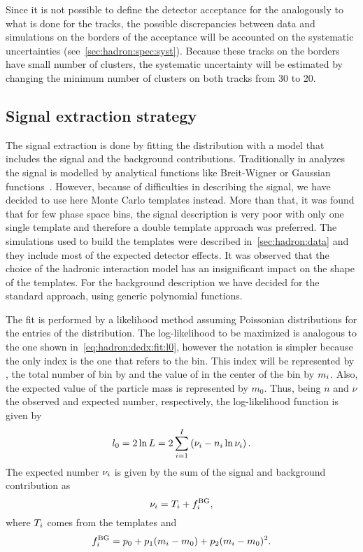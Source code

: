 Since it is not possible to define the detector acceptance for
the \vzeros analogously to what is done for the tracks, the possible
discrepancies between data and simulations on the borders of the acceptance
will be accounted on the systematic uncertainties (see~\cref{sec:hadron:spec:syst}).
Because these tracks on the borders have small number of clusters,
the systematic uncertainty will be estimated by changing the minimum number
of clusters on both tracks from 30 to 20. 

\subsection{Signal extraction strategy}
\label{sec:hadron:vzero:signal}


The signal extraction is done by fitting the \minv distribution
with a model that includes the signal and the background contributions.
Traditionally in \NASixtyOne analyzes the signal
is modelled by analytical functions like Breit-Wigner
or Gaussian functions~\cite{Abgrall:2015hmv,Aduszkiewicz:2015dmr}. 
However, because of difficulties in describing
the \kzeros signal, we have decided to use here
Monte Carlo templates instead. More than that, it was found
that for few \kzeros phase space bins,
the signal description is very poor
with only one single template and therefore a double template approach
was preferred.
The simulations used to build the templates were described
in~\cref{sec:hadron:data} and they include most of the expected
detector effects. It was observed that the choice of the
hadronic interaction model has an insignificant impact
on the shape of the templates.
For the background description we have decided
for the standard approach, using generic polynomial functions.



The fit is performed by a likelihood method assuming Poissonian
distributions for the entries of the \minv distribution.
The log-likelihood to be maximized is analogous to the one shown
in~\cref{eq:hadron:dedx:fit:l0}, however the notation is
simpler because the only index is the one
that refers to the \minv bin. This index will be represented by \imass,
the total number of \minv bin by \nmass and the value of \minv in the center
of the bin by $m_i$. Also, the expected value of the particle mass
is represented by $m_0$.
Thus, being $n$ and $\nu$ the observed and expected number, respectively,
the log-likelihood function is given by
\begin{equation}
  l_0 = 2\ln L = 2\sum_{i=1}^{I} \left(\nu_{i} - n_{i}\ln\nu_{i}\right). 
  \label{eq:hadron:vzero:fit:l0}
\end{equation}
The expected number $\nu_i$ is given by the sum of the signal
and background contribution as
\begin{equation}
  \nu_i = T_i + f^\text{BG}_i, 
  \label{eq:hadron:vzero:fit:nu}
\end{equation}
where $T_i$ comes from the templates and
\begin{equation}
  f^\text{BG}_i = p_0 + p_1(m_i-m_0)+p_2(m_i-m_0)^2.
  \label{eq:hadron:vzero:fit:bg}
\end{equation}


